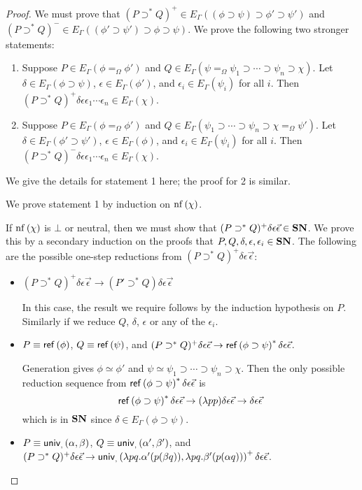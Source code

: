 \begin{proof}
We must prove that $(P \supset^* Q)^+ \in E_\Gamma((\phi \supset \psi) \supset \phi' \supset \psi')$ and
$(P \supset^* Q)^- \in E_\Gamma((\phi' \supset \psi') \supset \phi \supset \psi)$.  We prove the following
two stronger statements:

\begin{enumerate}
\item
Suppose $P \in E_\Gamma(\phi =_\Omega \phi')$ and $Q \in E_\Gamma(\psi =_\Omega \psi_1 \supset \cdots \supset \psi_n \supset \chi)$.
Let $\delta \in E_\Gamma(\phi \supset \psi)$, $\epsilon \in E_\Gamma(\phi')$, and $\epsilon_i \in E_\Gamma(\psi_i)$ for all $i$.
Then $(P \supset^* Q)^+ \delta \epsilon \epsilon_1 \cdots \epsilon_n \in E_\Gamma(\chi)$.
\item
Suppose $P \in E_\Gamma(\phi =_\Omega \phi')$ and $Q \in E_\Gamma(\psi_1 \supset \cdots \supset \psi_n \supset \chi =_\Omega \psi')$.
Let $\delta \in E_\Gamma(\phi' \supset \psi')$, $\epsilon \in E_\Gamma(\phi)$, and $\epsilon_i \in E_\Gamma(\psi_i)$ for all $i$.
Then $(P \supset^* Q)^- \delta \epsilon \epsilon_1 \cdots \epsilon_n \in E_\Gamma(\chi)$.
\end{enumerate}

We give the details for statement 1 here; the proof for 2 is similar.

We prove statement 1 by induction on $\mathrm{nf} \left( {\chi} \right)$.

If $\mathrm{nf} \left( {\chi} \right)$ is $\bot$ or neutral, then we must show that $(P \supset^* Q)^+ \delta \epsilon \vec{\epsilon} \in \mathbf{SN}$.  We prove this
by a secondary induction on the proofs that $P, Q, \delta, \epsilon, \epsilon_i \in \mathbf{SN}$.  The following are the possible
one-step reductions from $(P \supset^* Q)^+ \delta \epsilon \vec{\epsilon}$:

\begin{itemize}
\item
$(P \supset^* Q)^+ \delta \epsilon \vec{\epsilon} \rightarrow (P' \supset^* Q) \delta \epsilon \vec{\epsilon}$

In this case, the result we require follows by the induction hypothesis on $P$.  Similarly if we reduce $Q$, $\delta$, $\epsilon$
or any of the $\epsilon_i$.
\item
$P \equiv \mathsf{ref} \left( {\phi} \right)$, $Q \equiv \mathsf{ref} \left( {\psi} \right)$, and $(P \supset^* Q)^+ \delta \epsilon \vec{\epsilon} \rightarrow \mathsf{ref} \left( {\phi \supset \psi} \right)^* \delta \epsilon \vec{\epsilon}$.

Generation gives $\phi \simeq \phi'$ and $\psi \simeq \psi_1 \supset \cdots \supset \psi_n \supset \chi$.
Then the only possible reduction sequence from $\mathsf{ref} \left( {\phi \supset \psi} \right)^* \delta \epsilon \vec{\epsilon}$ is
\[ \mathsf{ref} \left( {\phi \supset \psi} \right)^* \delta \epsilon \vec{\epsilon} \rightarrow (\lambda p p) \delta \epsilon \vec{\epsilon} \rightarrow \delta \epsilon \vec{\epsilon} \]
which is in $\mathbf{SN}$ since $\delta \in E_\Gamma(\phi \supset \psi)$.
\item
$P \equiv \mathsf{univ}_{{} , {}} \left( {\alpha} , {\beta} \right)$, $Q \equiv \mathsf{univ}_{{} , {}} \left( {\alpha'} , {\beta'} \right)$, and $(P \supset^* Q)^+ \delta \epsilon \vec{\epsilon} \rightarrow \mathsf{univ}_{{} , {}} \left( {\lambda pq.\alpha' (p (\beta q))} , {\lambda pq.\beta' (p (\alpha q))} \right)^+ \delta \epsilon \vec{\epsilon}$.


\end{itemize}
\end{proof}
